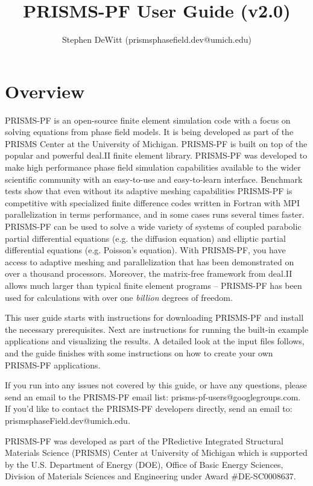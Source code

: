 \documentclass[10pt]{article} %
\title{PRISMS-PF User Guide (v2.0)}
\author{Stephen DeWitt (prismsphasefield.dev@umich.edu)}
\begin{document}
\maketitle

\tableofcontents

\clearpage

\section{Overview}
PRISMS-PF is an open-source finite element simulation code with a focus on solving equations from phase field models. It is being developed as part of the PRISMS Center at the University of Michigan. PRISMS-PF is built on top of the popular and powerful deal.II finite element library. PRISMS-PF was developed to make high performance phase field simulation capabilities available to the wider scientific community with an easy-to-use and easy-to-learn interface. Benchmark tests show that even without its adaptive meshing capabilities PRISMS-PF is competitive with specialized finite difference codes written in Fortran with MPI parallelization in terms performance,  and in some cases runs several times faster. PRISMS-PF can be used to solve a wide variety of systems of coupled parabolic partial differential equations (e.g. the diffusion equation) and elliptic partial differential equations (e.g. Poisson's equation). With PRISMS-PF, you have access to adaptive meshing and parallelization that has been demonstrated on over a thousand processors. Moreover, the matrix-free framework from deal.II allows much larger than typical finite element programs -- PRISMS-PF has been used for calculations with over one \emph{billion} degrees of freedom.

This user guide starts with instructions for downloading PRISMS-PF and install the necessary prerequisites. Next are instructions for running the built-in example applications and visualizing the results. A detailed look at the input files follows, and the guide finishes with some instructions on how to create your own PRISMS-PF applications.

If you run into any issues not covered by this guide, or have any questions, please send an email to the PRISMS-PF email list: prisms-pf-users@googlegroups.com. If you'd like to contact the PRISMS-PF developers directly, send an email to: prismsphaseField.dev@umich.edu.

PRISMS-PF was developed as part of the PRedictive Integrated Structural Materials Science (PRISMS) Center at University of Michigan which is supported by the U.S. Department of Energy (DOE), Office of Basic Energy Sciences, Division of Materials Sciences and Engineering under Award \#DE-SC0008637.
\end{document}
